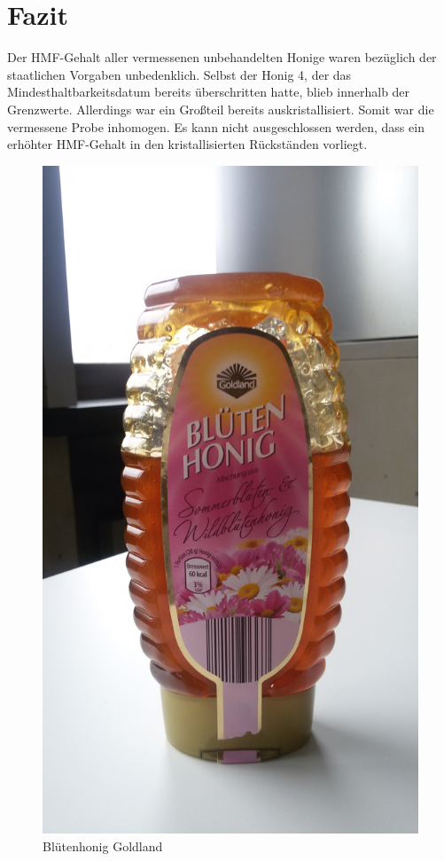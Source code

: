 \chapter{Fazit}
Der HMF-Gehalt aller vermessenen unbehandelten Honige waren bezüglich der staatlichen Vorgaben unbedenklich. Selbst der Honig 4, der das Mindesthaltbarkeitsdatum bereits überschritten hatte, blieb innerhalb der Grenzwerte. Allerdings war ein Großteil bereits auskristallisiert. Somit war die vermessene Probe inhomogen. Es kann nicht ausgeschlossen werden, dass ein erhöhter HMF-Gehalt in den kristallisierten Rückständen vorliegt.\\
\begin{figure}[htbp]
	\centering
		\includegraphics[width=1.00\textwidth]{../Bilder/20150416_182012.jpg}
	\caption{Blütenhonig Goldland}
	\label{fig:Blütenhonig}
\end{figure}

